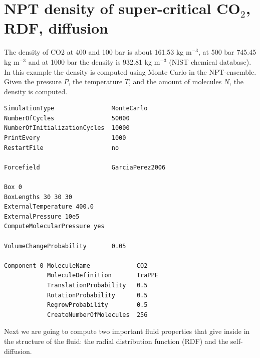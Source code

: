 \section{NPT density of super-critical CO$_2$, RDF, diffusion}

The density of CO2 at 400 and 100 bar is about 161.53 kg m$^{-3}$, at 500 bar 745.45 kg m$^{-3}$ and at 1000 bar the density is 
932.81 kg m$^{-3}$ (NIST chemical database). In this example the density is
computed using Monte Carlo in the NPT-ensemble. Given the pressure $P$, the temperature $T$, and the amount of molecules $N$,
the density is computed.

\begin{verbatim}
SimulationType                MonteCarlo
NumberOfCycles                50000
NumberOfInitializationCycles  10000
PrintEvery                    1000
RestartFile                   no

Forcefield                    GarciaPerez2006

Box 0
BoxLengths 30 30 30
ExternalTemperature 400.0
ExternalPressure 10e5
ComputeMolecularPressure yes

VolumeChangeProbability       0.05

Component 0 MoleculeName             CO2
            MoleculeDefinition       TraPPE
            TranslationProbability   0.5
            RotationProbability      0.5
            RegrowProbability        0.5
            CreateNumberOfMolecules  256
\end{verbatim}

\begin{center}
\end{center}

Next we are going to compute two important fluid properties that give inside in the structure of the fluid: the radial 
distribution function (RDF) and the self-diffusion.

\begin{center}
\end{center}

